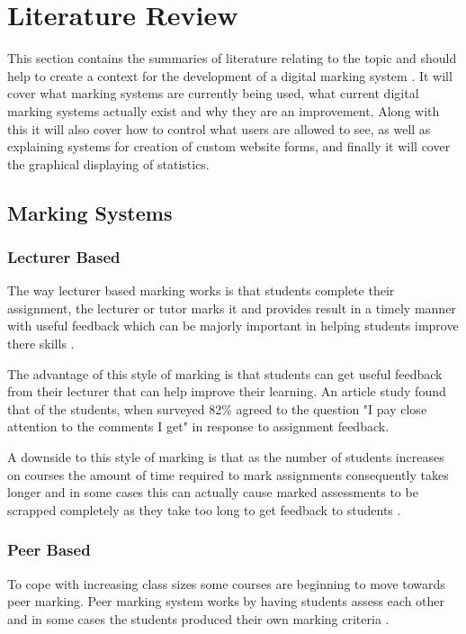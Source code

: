 \documentclass[12pt]{article}  %
\begin{document}
\newpage
\section{Literature Review}
This section contains the summaries of literature relating to the topic and should help to create a context for the development of a digital marking system . It will cover what marking systems are currently being used, what current digital marking systems  actually exist and why they are an improvement. Along with this it will also cover how to control what users are allowed to see, as well as explaining systems for creation of custom website forms, and finally it will cover the graphical displaying of statistics. 



\subsection{Marking Systems}

\subsubsection{Lecturer Based}
The way lecturer based marking works is that students complete their assignment, the lecturer or tutor marks it and provides result in a timely manner with useful feedback which can be majorly important in helping students improve there skills  \cite{tang_investigating_2011}.

The advantage of this style of marking is that students can get useful feedback from their lecturer that can help improve their learning.  An article study \cite{higgins_conscientious_2002} found that of the students, when surveyed 82\% agreed to the question "I pay close attention to the comments I get" in response to assignment feedback.

A downside to this style of marking is that as the number of students increases on courses the amount of time required to mark assignments consequently takes longer and in some cases this can actually cause marked assessments to be scrapped completely as they take too long to get feedback to students \cite{brown_assessment_1999}.


\subsubsection{Peer Based}
To cope with increasing class sizes some courses are beginning to move towards peer marking. Peer marking system works by having students assess each other and in some cases  the students produced their own marking criteria \cite{orsmond_use_2000}.
\end{document}
